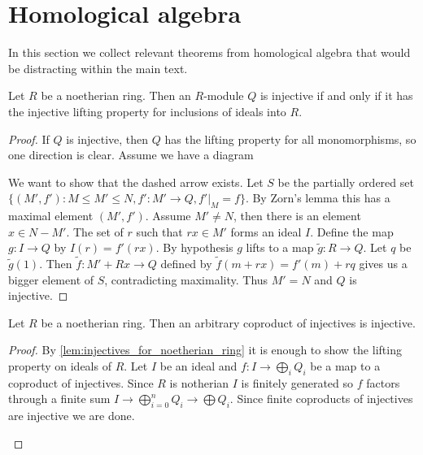 \section{Homological algebra}\label{sec:appendix}

In this section we collect relevant theorems from homological algebra that would be distracting within the main text.

\begin{lemma}\cite[Chapter I, theorem 3.2]{CE56} \label{lem:injectives_for_noetherian_ring}
	Let $R$ be a noetherian ring. Then an $R$-module $Q$ is injective if and only if it has the injective lifting property for inclusions of ideals into $R$.
	\begin{proof}
		If $Q$ is injective, then $Q$ has the lifting property for all monomorphisms, so one direction is clear. Assume we have a diagram
		\begin{center}
		\end{center}
		We want to show that the dashed arrow exists. Let $S$ be the partially ordered set $\{(M', f'): M \leq M' \leq N, f'\colon M' \to Q, f'|_M = f\}$. By Zorn's lemma this has a maximal element $(M', f')$. Assume $M' \neq N$, then there is an element $x \in N - M'$. The set of $r$ such that $rx \in M'$ forms an ideal $I$. Define the map $g: I \to Q$ by $I(r) = f'(rx)$. By hypothesis $g$ lifts to a map $\tilde{g}:R \to Q$. Let $q$ be $\tilde{g}(1)$. Then $\tilde{f}: M' + Rx \to Q$ defined by $\tilde{f}(m + rx) = f'(m) + rq$ gives us a bigger element of $S$, contradicting maximality. Thus $M'=N$ and $Q$ is injective.
	\end{proof}
\end{lemma}

\begin{theorem}
	Let $R$ be a noetherian ring. Then an arbitrary coproduct of injectives is injective.
	\begin{proof}
		By \cref{lem:injectives_for_noetherian_ring} it is enough to show the lifting property on ideals of $R$. Let $I$ be an ideal and $f:I \to \bigoplus_i Q_i$ be a map to a coproduct of injectives. Since $R$ is notherian $I$ is finitely generated so $f$ factors through a finite sum $I \to \bigoplus_{i=0}^n Q_i \to \bigoplus Q_i$. Since finite coproducts of injectives are injective we are done.
		\begin{center}
		\end{center}
	\end{proof}
\end{theorem}

